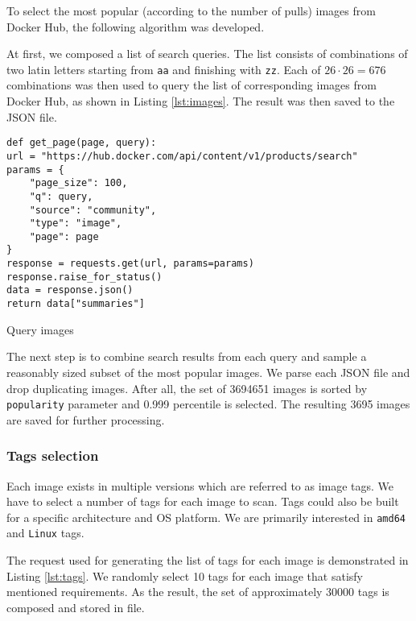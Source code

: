 To select the most popular (according to the number of pulls) images from Docker Hub, the following algorithm was developed.

At first, we composed a list of search queries. The list consists of combinations of two latin letters starting from \texttt{aa} and finishing with \texttt{zz}. Each of $26 \cdot 26 = 676$ combinations was then used to query the list of corresponding images from Docker Hub, as shown in Listing \ref{lst:images}. The result was then saved to the JSON file.
\begin{listing}[htp]
    \centering
    \begin{minipage}{0.8\linewidth}
        \begin{verbatim}
def get_page(page, query):
url = "https://hub.docker.com/api/content/v1/products/search"
params = {
    "page_size": 100,
    "q": query,
    "source": "community",
    "type": "image",
    "page": page
}
response = requests.get(url, params=params)
response.raise_for_status()
data = response.json()
return data["summaries"]
        \end{verbatim}
    \end{minipage}
    \caption{Query images}
    \label{lst:images}
\end{listing}

The next step is to combine search results from each query and sample a reasonably sized subset of the most popular images. We parse each JSON file and drop duplicating images. After all, the set of 3694651 images is sorted by \texttt{popularity} parameter and 0.999 percentile is selected. The resulting 3695 images are saved for further processing.

\subsubsection{Tags selection}

Each image exists in multiple versions which are referred to as image tags. We have to select a number of tags for each image to scan. Tags could also be built for a specific architecture and OS platform. We are primarily interested in \texttt{amd64} and \texttt{Linux} tags. 

The request used for generating the list of tags for each image is demonstrated in Listing \ref{lst:tags}. We randomly select 10 tags for each image that satisfy mentioned requirements. As the result, the set of approximately 30000 tags is composed and stored in file.

